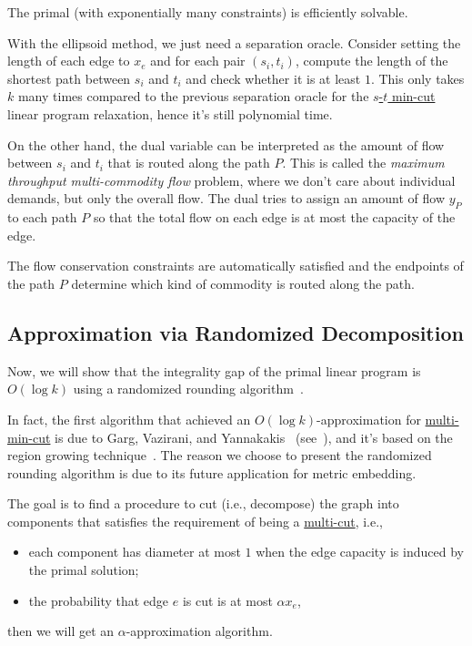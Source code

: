 \begin{remark}
	The primal (with exponentially many constraints) is efficiently solvable.
\end{remark}
\begin{explanation}
	With the ellipsoid method, we just need a separation oracle. Consider setting the length of each edge to \(x_e\) and for each pair \((s_i, t_i)\), compute the length of the shortest path between \(s_i\) and \(t_i\) and check whether it is at least \(1\). This only takes \(k\) many times compared to the previous separation oracle for the \hyperref[prb:s-t-min-cut]{\(s\)-\(t\) min-cut} linear program relaxation, hence it's still polynomial time.
\end{explanation}

On the other hand, the dual variable can be interpreted as the amount of flow between \(s_i\) and \(t_i\) that is routed along the path \(P\). This is called the \emph{maximum throughput multi-commodity flow} problem, where we don't care about individual demands, but only the overall flow. The dual tries to assign an amount of flow \(y_P\) to each path \(P\) so that the total flow on each edge is at most the capacity of the edge.

\begin{note}
	The flow conservation constraints are automatically satisfied and the endpoints of the path \(P\) determine which kind of commodity is routed along the path.
\end{note}

\subsection{Approximation via Randomized Decomposition}
Now, we will show that the integrality gap of the primal linear program is \(O(\log k)\) using a randomized rounding algorithm~\cite{calinescu2005approximation}.

\begin{note}
	In fact, the first algorithm that achieved an \(O(\log k)\)-approximation for \hyperref[prb:multi-min-cut]{multi-min-cut} is due to Garg, Vazirani, and Yannakakis~\cite{garg1993approximate} (see~\cite{vazirani2001approximation,williamson2011design}), and it's based on the region growing technique~\cite{leighton1999multicommodity}. The reason we choose to present the randomized rounding algorithm is due to its future application for metric embedding.
\end{note}

The goal is to find a procedure to cut (i.e., decompose) the graph into components that satisfies the requirement of being a \hyperref[prb:multi-min-cut]{multi-cut}, i.e.,
\begin{itemize}
	\item each component has diameter at most \(1\) when the edge capacity is induced by the primal solution;
	\item the probability that edge \(e\) is cut is at most \(\alpha x_e\),
\end{itemize}
then we will get an \(\alpha \)-approximation algorithm.

